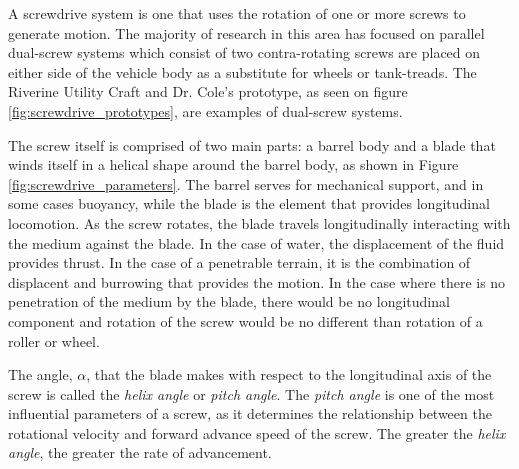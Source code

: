 


A screwdrive system is one that uses the rotation of one or more screws to generate motion. The majority of research in this area has focused on parallel dual-screw systems which consist of two contra-rotating screws are placed on either side of the vehicle body as a substitute for wheels or tank-treads. The Riverine Utility Craft and Dr. Cole's prototype, as seen on figure \ref{fig:screwdrive_prototypes}, are examples of dual-screw systems. 


The screw itself is comprised of two main parts: a barrel body and a blade that winds itself in a helical shape around the barrel body, as shown in Figure \ref{fig:screwdrive_parameters}. The barrel serves for mechanical support, and in some cases buoyancy, while the blade is the element that provides longitudinal locomotion. As the screw rotates, the blade travels longitudinally interacting with the medium against the blade. In the case of water, the displacement of the fluid provides thrust. In the case of a penetrable terrain, it is the combination of displacent and burrowing that provides the motion. In the case where there is no penetration of the medium by the blade, there would be no longitudinal component and rotation of the screw would be no different than rotation of a roller or wheel. 



The angle, \emph{\( \alpha \)}, that the blade makes with respect to the longitudinal axis of the screw is called the \emph{helix angle} or \emph{pitch angle}. The \emph{pitch angle} is one of the most influential parameters of a screw, as it determines the relationship between the rotational velocity and forward advance speed of the screw. The greater the \emph{helix angle}, the greater the rate of advancement. 


